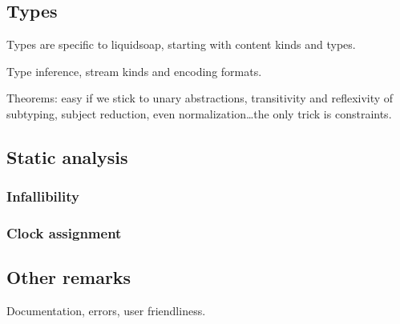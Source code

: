 \documentclass{llncs}
\begin{document}
\subsection{Types}

Types are specific to liquidsoap, starting with content kinds and types.

Type inference, stream kinds and encoding formats.

Theorems: easy if we stick to unary abstractions,
transitivity and reflexivity of subtyping, subject reduction,
even normalization\ldots the only trick is constraints.

\subsection{Static analysis}

\subsubsection{Infallibility}
\subsubsection{Clock assignment}

\subsection{Other remarks}

Documentation, errors, user friendliness.



\end{document}
